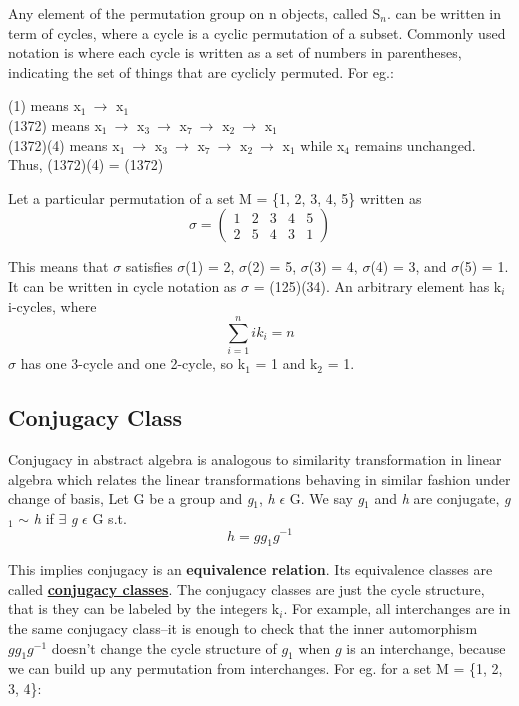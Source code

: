 Any element of the permutation group on n objects, called S$_n$. can be written
in term of cycles, where a cycle is a cyclic permutation of a subset.
Commonly used notation is where each cycle is written as a set of numbers in parentheses, 
indicating the set of things that are cyclicly permuted. For eg.:

(1) means x$_1 \: \rightarrow$ x$_1$ \\
(1372) means x$_1 \: \rightarrow$ x$_3 \: \rightarrow$ x$_7 \: \rightarrow$ x$_2 \: \rightarrow$ x$_1$ \\
(1372)(4) means x$_1 \: \rightarrow$ x$_3 \: \rightarrow$ x$_7 \: \rightarrow$ x$_2 \: \rightarrow$ x$_1$ while x$_4$ remains unchanged.
Thus, (1372)(4) = (1372)

Let a particular permutation of a set M = \{1, 2, 3, 4, 5\} written as
\begin{equation}
   \sigma = \begin{pmatrix}
        1 & 2 & 3 & 4 & 5\\ 
        2 & 5 & 4 & 3 & 1
   \end{pmatrix}
\end{equation}

This means that $\sigma$ satisfies $\sigma$(1) = 2, $\sigma$(2) = 5, $\sigma$(3) = 4, $\sigma$(4) = 3, and $\sigma$(5) = 1.
It can be written in cycle notation as $\sigma$ = (125)(34).
An arbitrary element has k$_i$ i-cycles, where
\begin{equation}
    \sum_{i=1}^{n} ik_i = n
\end{equation}
$\sigma$ has one 3-cycle and one 2-cycle, so k$_1$ = 1 and k$_2$ = 1.

\subsection{Conjugacy Class}
Conjugacy in abstract algebra is analogous to similarity transformation in linear algebra
which relates the linear transformations behaving in similar fashion under change of basis,
Let G be a group and \textit{g$_1$}, \textit{h} $\epsilon$ G. We say \textit{g$_1$} and \textit{h} are conjugate,
\textit{g$_1$} $\sim$ \textit{h} if $\exists$ \textit{g} $\epsilon$ G s.t. 
\begin{equation}
    h = gg_1g^{-1} 
\end{equation}

This implies conjugacy is an \textbf{equivalence relation}. Its equivalence classes are called \href{https://www.youtube.com/watch?v=yOt3ppQGuto}{\textbf{conjugacy classes}}.
The conjugacy classes are just the cycle structure, that is they can be labeled
by the integers k$_i$. For example, all interchanges are in the same conjugacy class--it is enough to check that the inner automorphism $gg_1g^{-1}$ doesn't
change the cycle structure of $g_1$ when $g$ is an interchange, because we can build up any permutation from interchanges.
For eg. for a set M = \{1, 2, 3, 4\}:

